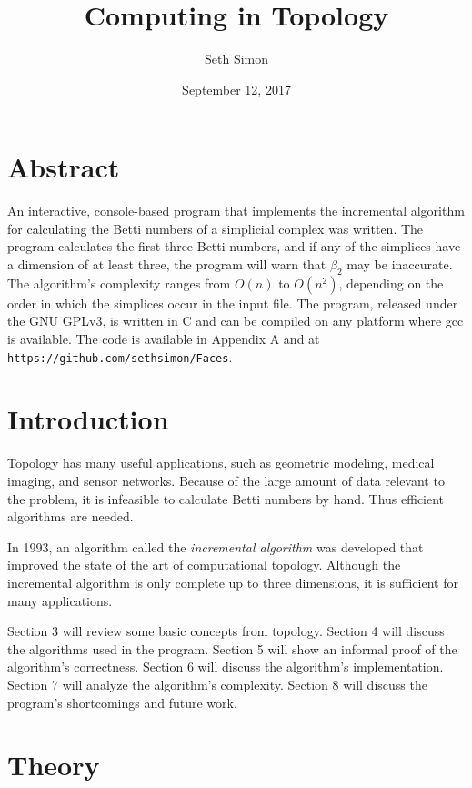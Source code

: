 \documentclass{article}
\title{Computing in Topology}
\author{Seth Simon}
\date{September 12, 2017}
\begin{document}
\maketitle

\section{Abstract}
An interactive, console-based program that implements the
incremental algorithm for
calculating the Betti numbers of a simplicial complex
was written. The program calculates the first three
Betti numbers, and if any of the simplices have a dimension
of at least three, the program will warn that
$\beta_2$ may be inaccurate. The algorithm's complexity
ranges from $O(n)$ to $O(n^2)$, depending on the order in which
the simplices occur in the input file.
The program, released under the GNU GPLv3, is written in C
and can be compiled on any platform where gcc is available.
The code is available in Appendix A and at
\texttt{https://github.com/sethsimon/Faces}.

\section{Introduction}
Topology has many useful applications, such as geometric
modeling, medical imaging, and sensor networks. Because
of the large amount of data relevant to the problem, it
is infeasible to calculate Betti numbers by hand. Thus
efficient algorithms are needed.

In 1993, an algorithm called the \emph{incremental algorithm}
\cite{delfinado} was developed that improved the state of the
art of computational topology. Although the incremental
algorithm is only complete up to three dimensions,
it is sufficient for many applications.

Section 3 will review some basic concepts from topology.
Section 4 will discuss the algorithms used in the program.
Section 5 will show an informal proof of the algorithm's
correctness.
Section 6 will discuss the algorithm's implementation.
Section 7 will analyze the algorithm's complexity.
Section 8 will discuss the program's shortcomings and future work.

\section{Theory}
\end{document}
